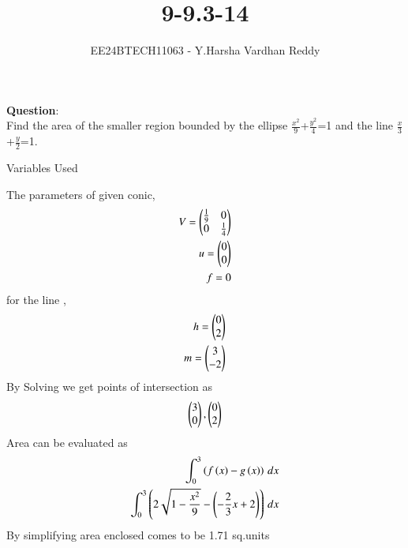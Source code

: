 \documentclass[journal]{IEEEtran}
\begin{document}

\vspace{3cm}

\title{9-9.3-14}
\author{EE24BTECH11063 - Y.Harsha Vardhan Reddy}
{\let\newpage\relax\maketitle}

\renewcommand{\thefigure}{\theenumi}
\renewcommand{\thetable}{\theenumi}
\setlength{\intextsep}{10pt} %


\renewcommand{\thetable}{\theenumi}
\textbf{Question}:\\
Find the area of the smaller region bounded by the ellipse $\frac{x^2}{9}$+$\frac{y^2}{4}$=1 and the line $\frac{x}{3}$+$\frac{y}{2}$=1.
\\
\solution
\begin{table}[h!]    
  \centering
  
  \caption{Variables Used}
  \label{tab1-1.2-20}
\end{table}
The parameters of given conic,
\begin{align}
	V=\begin{pmatrix}\frac{1}{9} & 0 \\ 0 & \frac{1}{4}\end{pmatrix} \\
	u=\begin{pmatrix}0 \\ 0\end{pmatrix} \\
	f=0
\end{align}
for the line ,
\begin{align}
h=\begin{pmatrix}0\\2\end{pmatrix}\\
m=\begin{pmatrix}3\\-2\end{pmatrix}
\end{align}
By Solving we get points of intersection as 
\begin{align}
	\begin{pmatrix}3\\0\end{pmatrix},\begin{pmatrix}0\\ 2\end{pmatrix}
\end{align}
Area can be evaluated as
\begin{align}
	\int_{0}^{3} \left(f\left(x\right)-g\left(x\right)\right) \, dx \\
	\int_{0}^{3} \left(2\sqrt{1-\frac{x^2}{9}}-\left(-\frac{2}{3}x+2\right)\right) \, dx
\end{align}
By simplifying area enclosed comes to be 1.71 sq.units
\end{document}
